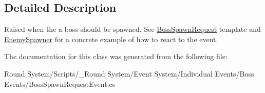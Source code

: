 \subsection{Detailed Description}
Raised when the a boss should be spawned. See \hyperlink{class_round_manager_1_1_boss_spawn_request}{Boss\+Spawn\+Request} template and \hyperlink{class_round_manager_1_1_enemy_spawner}{Enemy\+Spawner} for a concrete example of how to react to the event. 



The documentation for this class was generated from the following file\+:\begin{DoxyCompactItemize}
\item 
Round System/\+Scripts/\+\_\+\+Round System/\+Event System/\+Individual Events/\+Boss Events/Boss\+Spawn\+Request\+Event.\+cs\end{DoxyCompactItemize}
